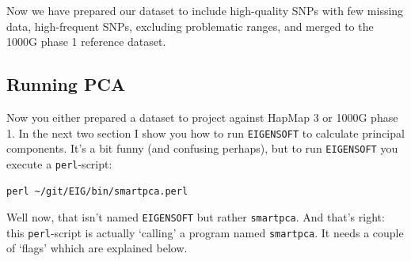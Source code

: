 \documentclass[
]{book}
\begin{document}
Now we have prepared our dataset to include high-quality SNPs with few missing data, high-frequent SNPs, excluding problematic ranges, and merged to the 1000G phase 1 reference dataset.

\hypertarget{running-pca}{%
\subsection{Running PCA}\label{running-pca}}

Now you either prepared a dataset to project against HapMap 3 or 1000G phase 1. In the next two section I show you how to run \texttt{EIGENSOFT} to calculate principal components. It's a bit funny (and confusing perhaps), but to run \texttt{EIGENSOFT} you execute a \texttt{perl}-script:

\begin{verbatim}
perl ~/git/EIG/bin/smartpca.perl
\end{verbatim}

Well now, that isn't named \texttt{EIGENSOFT} but rather \texttt{smartpca}. And that's right: this \texttt{perl}-script is actually `calling' a program named \texttt{smartpca}. It needs a couple of `flags' whhich are explained below.
\end{document}
